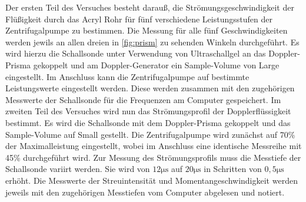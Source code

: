 Der ersten Teil des Versuches besteht darauß, die Strömungsgeschwindigkeit der Flüßigkeit durch das Acryl Rohr für fünf verschiedene Leistungsstufen der Zentrifugalpumpe zu
bestimmen. Die Messung für alle fünf Geschwindigkeiten werden jewils an allen dreien in \autoref{fig:prism} zu sehenden Winkeln durchgeführt.
\newline
Es wird hierzu die Schallsonde unter Verwendung von Ultraschallgel an das Doppler-Prisma gekoppelt und am Doppler-Generator ein Sample-Volume von Large eingestellt. Im
Anschluss kann die Zentrifugalpumpe auf bestimmte Leistungswerte eingestellt werden. Diese werden zusammen mit den zugehörigen Messwerte der Schallsonde für die Frequenzen
am Computer gespeichert.
\newline\newline
Im zweiten Teil des Versuches wird nun das Strömungsprofil der Dopplerflüssigkeit bestimmt. Es wird die Schallsonde mit dem Doppler-Prisma gekoppelt und das Sample-Volume
auf Small gestellt. Die Zentrifugalpumpe wird zunächst auf 70\% der Maximalleistung eingestellt, wobei im Anschluss eine identische Messreihe mit 45\% durchgeführt
wird.
\newline
Zur Messung des Strömungsprofils muss die Messtiefe der Schallsonde variirt werden. Sie wird von $12\si{\micro\s}$ auf $20\si{\micro\s}$ in Schritten
von $0,5\si{\micro\s}$ erhöht. Die Messwerte der Streuintensität und Momentangeschwindigkeit werden jeweils mit den zugehörigen Messtiefen vom Computer abgelesen und
notiert.